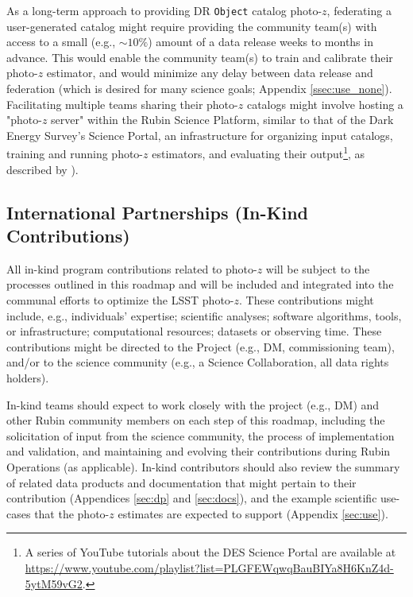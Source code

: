 \documentclass[DM,lsstdraft,toc]{lsstdoc}
\begin{document}
As a long-term approach to providing DR {\tt Object} catalog photo-$z$, federating a user-generated catalog might require providing the community team(s) with access to a small (e.g., $\sim10\%$) amount of a data release weeks to months in advance.
This would enable the community team(s) to train and calibrate their photo-$z$ estimator, and would minimize any delay between data release and federation (which is desired for many science goals; Appendix \ref{ssec:use_none}).
Facilitating multiple teams sharing their photo-$z$ catalogs might involve hosting a "photo-$z$ server" within the Rubin Science Platform, similar to that of the Dark Energy Survey's Science Portal, an infrastructure for organizing input catalogs, training and running photo-$z$ estimators, and evaluating their output\footnote{A series of YouTube tutorials about the DES Science Portal are available at \url{https://www.youtube.com/playlist?list=PLGFEWqwqBauBIYa8H6KnZ4d-5ytM59vG2}.}, as described by \citet{2018A&C....25...58G}).

\subsection{International Partnerships (In-Kind Contributions)}\label{ssec:time_inkind}

All in-kind program contributions related to photo-$z$ will be subject to the processes outlined in this  roadmap and will be included and integrated into the communal efforts to optimize the LSST photo-$z$.
These contributions might include, e.g., individuals' expertise; scientific analyses; software algorithms, tools, or infrastructure; computational resources; datasets or observing time.
These contributions might be directed to the Project (e.g., DM, commissioning team), and/or to the science community (e.g., a Science Collaboration, all data rights holders). 

In-kind teams should expect to work closely with the project (e.g., DM) and other Rubin community members on each step of this  roadmap, including the solicitation of input from the science community, the process of implementation and validation, and maintaining and evolving their contributions during Rubin Operations (as applicable).
In-kind contributors should also review the summary of related data products and documentation that might pertain to their contribution (Appendices \ref{sec:dp} and  \ref{sec:docs}), and the example scientific use-cases that the photo-$z$ estimates are expected to support (Appendix \ref{sec:use}).
\end{document}
